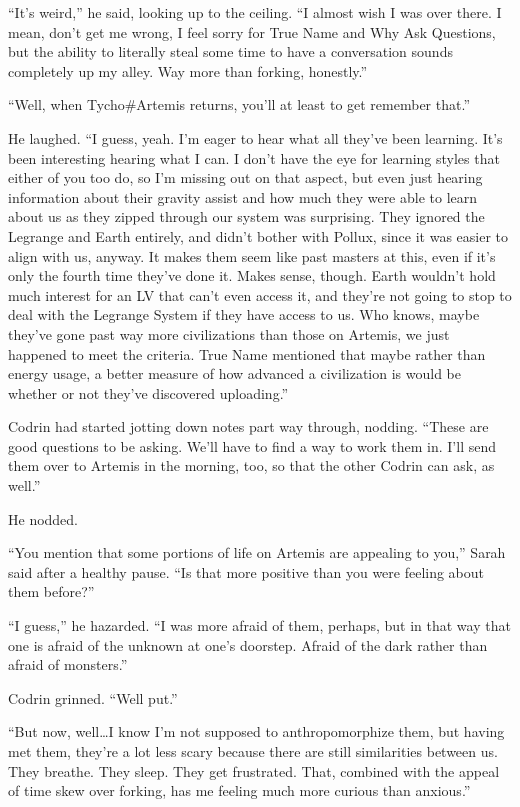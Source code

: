 ``It's weird,'' he said, looking up to the ceiling. ``I almost wish I was over there. I mean, don't get me wrong, I feel sorry for True Name and Why Ask Questions, but the ability to literally steal some time to have a conversation sounds completely up my alley. Way more than forking, honestly.''

``Well, when Tycho\#Artemis returns, you'll at least to get remember that.''

He laughed. ``I guess, yeah. I'm eager to hear what all they've been learning. It's been interesting hearing what I can. I don't have the eye for learning styles that either of you too do, so I'm missing out on that aspect, but even just hearing information about their gravity assist and how much they were able to learn about us as they zipped through our system was surprising. They ignored the Legrange and Earth entirely, and didn't bother with Pollux, since it was easier to align with us, anyway. It makes them seem like past masters at this, even if it's only the fourth time they've done it. Makes sense, though. Earth wouldn't hold much interest for an LV that can't even access it, and they're not going to stop to deal with the Legrange System if they have access to us. Who knows, maybe they've gone past way more civilizations than those on Artemis, we just happened to meet the criteria. True Name mentioned that maybe rather than energy usage, a better measure of how advanced a civilization is would be whether or not they've discovered uploading.''

Codrin had started jotting down notes part way through, nodding. ``These are good questions to be asking. We'll have to find a way to work them in. I'll send them over to Artemis in the morning, too, so that the other Codrin can ask, as well.''

He nodded.

``You mention that some portions of life on Artemis are appealing to you,'' Sarah said after a healthy pause. ``Is that more positive than you were feeling about them before?''

``I guess,'' he hazarded. ``I was more afraid of them, perhaps, but in that way that one is afraid of the unknown at one's doorstep. Afraid of the dark rather than afraid of monsters.''

Codrin grinned. ``Well put.''

``But now, well\ldots I know I'm not supposed to anthropomorphize them, but having met them, they're a lot less scary because there are still similarities between us. They breathe. They sleep. They get frustrated. That, combined with the appeal of time skew over forking, has me feeling much more curious than anxious.''

